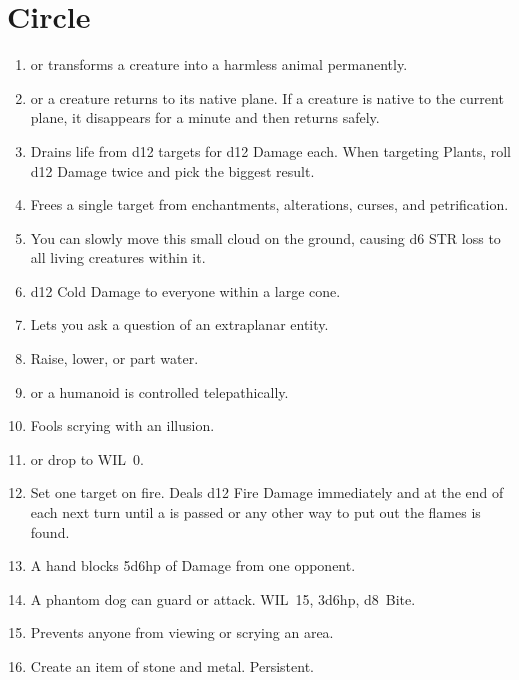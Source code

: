 \documentclass[itdr]{subfiles}
\begin{document}
\vfill
\break

\section{ Circle}
\def \spellcircle {5}
\begin{enumerate}
	\item {}  or transforms a creature into a harmless animal permanently.
	\item {}  or a creature returns to its native plane. If a creature is native to the current plane, it disappears for a minute and then returns safely.
	\item {} Drains life from d12 targets for d12 Damage each. When targeting Plants, roll d12 Damage twice and pick the biggest result.
	\item {} Frees a single target from enchantments, alterations, curses, and \mbox{petrification}.
	\item {} You can slowly move this small cloud on the ground, causing d6 STR loss to all living creatures within it.
	\item {} d12 Cold Damage to everyone within a large cone.
	\item {} Lets you ask a question of an extraplanar entity.
	\item {} Raise, lower, or part water.
	\item {}  or a humanoid is controlled telepathically.
	\item {} Fools scrying with an illusion.
	\item {}  or drop to WIL~0.
	\item {} Set one target on fire. Deals d12 Fire Damage immediately and at the end of each next turn until a  is passed or any other way to put out the flames is found.
	\item {} A hand blocks 5d6hp of Damage from one opponent.
	\item {} A phantom dog can guard or attack. WIL~15, 3d6hp, d8~Bite.
	\item {} Prevents anyone from viewing or scrying an area.
	\item {} Create an item of stone and metal. Persistent.

\end{enumerate}
\end{document}
